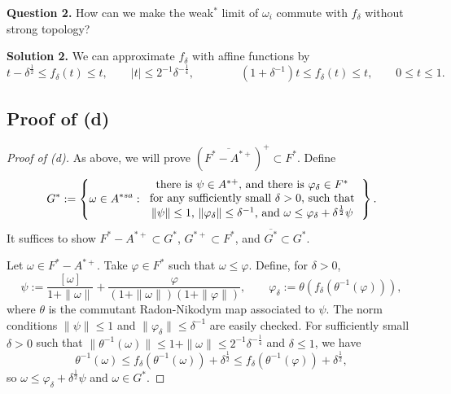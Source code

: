 \documentclass{../../../../small}
\begin{document}
\noindent\textbf{Question 2.}
How can we make the weak$^*$ limit of $\omega_i$ commute with $f_\delta$ without strong topology?

\noindent\textbf{Solution 2.}
We can approximate $f_\delta$ with affine functions
by
\[t-\delta^{\frac12}\le f_\delta(t)\le t,\qquad|t|\le2^{-1}\delta^{-\frac14},\qquad\qquad(1+\delta^{-1})t\le f_\delta(t)\le t,\qquad 0\le t\le1.\]



\newpage

\subsection{Proof of (d)}

\begin{proof}[Proof of (d)]

As above, we will prove $(\overline{F^*-A^{*+}})^+\subset F^*$.
Define
\[G^*:=\left\{\omega\in A^{*sa}:\begin{tabular}{c}
there is $\psi\in A^{*+}$, and there is $\varphi_\delta\in F^*$ \\
for any sufficiently small $\delta>0$,
such that\\
$\|\psi\|\le1$, $\|\varphi_\delta\|\le\delta^{-1}$, and $\omega\le\varphi_\delta+\delta^{\frac12}\psi$
\end{tabular}\right\}.\]
It suffices to show $F^*-A^{*+}\subset G^*$, $G^{*+}\subset F^*$, and $\overline{G^*}\subset G^*$.

Let $\omega\in F^*-A^{*+}$.
Take $\varphi\in F^*$ such that $\omega\le\varphi$.
Define, for $\delta>0$,
\[\psi:=\frac{[\omega]}{1+\|\omega\|}+\frac\varphi{(1+\|\omega\|)(1+\|\varphi\|)},\qquad\varphi_\delta:=\theta(f_\delta(\theta^{-1}(\varphi))),\]
where $\theta$ is the commutant Radon-Nikodym map associated to $\psi$.
The norm conditions $\|\psi\|\le1$ and $\|\varphi_\delta\|\le\delta^{-1}$ are easily checked.
For sufficiently small $\delta>0$ such that $\|\theta^{-1}(\omega)\|\le1+\|\omega\|\le2^{-1}\delta^{-\frac14}$ and $\delta\le1$, we have
\[\theta^{-1}(\omega)\le f_\delta(\theta^{-1}(\omega))+\delta^{\frac12}\le f_\delta(\theta^{-1}(\varphi))+\delta^{\frac12},\]
so $\omega\le\varphi_\delta+\delta^{\frac12}\psi$ and $\omega\in G^*$.


\end{proof}
\end{document}
